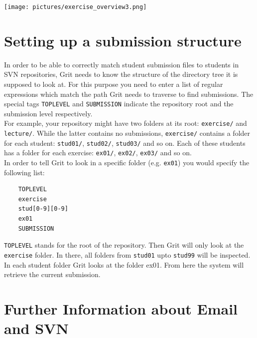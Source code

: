 \documentclass[10pt,a4paper, titlepage, toc=idx]{scrreprt}
\theoremstyle{definition}
\theoremstyle{plain}
\newcommand*{\product}{Grit}
\begin{document}
\begin{center}
	\texttt{[image: pictures/exercise\_overview3.png]}
\end{center}

	\section{Setting up a submission structure}\label{structure}
In order to be able to correctly match student submission files to students in SVN repositories, \product{} needs to know the structure of the directory tree it is supposed to look at. For this purpose you need to enter a list of regular expressions which match the path \product{} needs to traverse to find submissions. The special tags \texttt{TOPLEVEL} and \texttt{SUBMISSION} indicate the repository root and the submission level respectively.\\

\noindent For example, your repository might have two folders at its root: \texttt{exercise/} and \texttt{lecture/}. While the latter contains no submissions, \texttt{exercise/} contains a folder for each student: \texttt{stud01/}, \texttt{stud02/}, \texttt{stud03/} and so on. Each of these students has a folder for each exercise: \texttt{ex01/}, \texttt{ex02/}, \texttt{ex03/} and so on.\\
In order to tell \product{} to look in a specific folder (e.g. \texttt{ex01}) you would specify the following list:

\begin{lstlisting}
	TOPLEVEL
	exercise
	stud[0-9][0-9]
	ex01
	SUBMISSION
\end{lstlisting}

\texttt{TOPLEVEL} stands for the root of the repository. Then \product{} will only look at the \texttt{exercise} folder. In there, all folders from \texttt{stud01} upto \texttt{stud99} will be inspected. In each student folder \product{} looks at the folder ex01. From here the system will retrieve the current submission. 
        	
\section{Further Information about Email and SVN} \label{dataSourceSpecific} 
\end{document}
